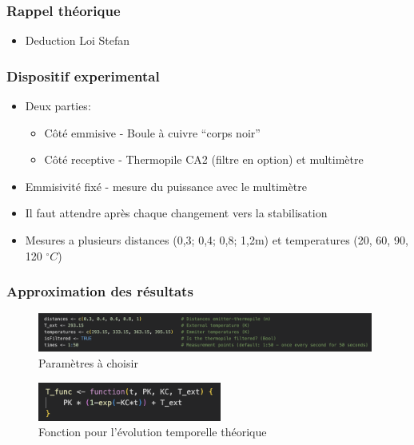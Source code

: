 \documentclass{beamer}
\newcommand{\newlines}{\newline\newline}
\begin{document}
\begin{frame}
\frametitle{Rappel théorique}

\begin{itemize}
	\item{Deduction Loi Stefan}

\end{itemize}

\end{frame}





\begin{frame}
\frametitle{Dispositif experimental}

\begin{itemize}
	\item{Deux parties:\newline
	\begin{itemize}
		\item{Côté emmisive - Boule à cuivre ``corps noir''\newline}
		\item{Côté receptive - Thermopile CA2 (filtre en option) et multimètre\newlines}
	\end{itemize}}
	\item{Emmisivité fixé - mesure du puissance avec le multimètre\newline}
	\item{Il faut attendre après chaque changement vers la stabilisation\newline}
	\item{Mesures a plusieurs distances (0,3; 0,4; 0,8; 1,2m) et temperatures (20, 60, 90, 120 $^\circ C$)}
	
\end{itemize}	
	
\end{frame}





\begin{frame}
\frametitle{Approximation des résultats}

\begin{figure}
\includegraphics[height=0.5in]{Fig/stefan-params.png}
\caption{Paramètres à choisir}
\end{figure}

\begin{figure}
\includegraphics[height=0.5in]{Fig/evol-temporelle.png}
\caption{Fonction pour l'évolution temporelle théorique}
\end{figure}

\end{frame}
\end{document}
